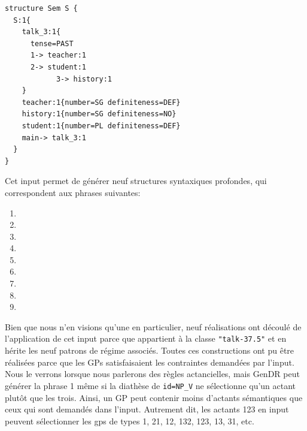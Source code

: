 \begin{lstlisting}[language=mate, caption=Structure sémantique de \form{The teacher talked about history to the students}, label=fig:history]
structure Sem S {
  S:1{
    talk_3:1{
      tense=PAST 
      1-> teacher:1
      2-> student:1
			3-> history:1
    }
    teacher:1{number=SG definiteness=DEF}
    history:1{number=SG definiteness=NO}
    student:1{number=PL definiteness=DEF}
    main-> talk_3:1
  }
}
\end{lstlisting}

Cet input permet de générer neuf structures syntaxiques profondes, qui correspondent aux phrases suivantes:

\begin{enumerate}
  \item {}
  \item {}
  \item {}
  \item {}
  \item {}
  \item {}
  \item {}
  \item {}
  \item {}
\end{enumerate}

Bien que nous n'en visions qu'une en particulier, neuf réalisations ont découlé de l'application de cet input parce que  appartient à la classe \texttt{"talk-37.5"} et en hérite les neuf patrons de régime associés. Toutes ces constructions ont pu être réalisées parce que les \acp{GP} satisfaisaient les contraintes demandées par l'input. Nous le verrons lorsque nous parlerons des règles actancielles, mais GenDR peut générer la phrase 1 même si la diathèse de \texttt{id=NP\_V} ne sélectionne qu'un actant plutôt que les trois. Ainsi, un \ac{GP} peut contenir moins d'actants sémantiques que ceux qui sont demandés dans l'input. Autrement dit, les actants 123 en input peuvent sélectionner les gps de types 1, 21, 12, 132, 123, 13, 31, etc. 

